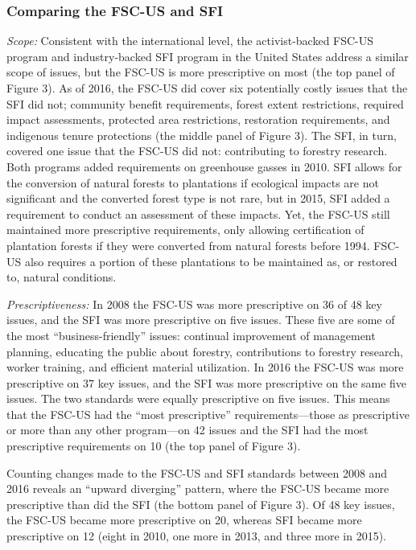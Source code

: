 \documentclass[
      12pt,
            Review ]{article}
\begin{document}
\subsubsection{Comparing the FSC-US and
SFI}\label{comparing-the-fsc-us-and-sfi}

\emph{Scope:} Consistent with the international level, the
activist-backed FSC-US program and industry-backed SFI program in the
United States address a similar scope of issues, but the FSC-US is more
prescriptive on most (the top panel of Figure 3). As of 2016, the FSC-US
did cover six potentially costly issues that the SFI did not; community
benefit requirements, forest extent restrictions, required impact
assessments, protected area restrictions, restoration requirements, and
indigenous tenure protections (the middle panel of Figure 3). The SFI,
in turn, covered one issue that the FSC-US did not: contributing to
forestry research. Both programs added requirements on greenhouse gasses
in 2010. SFI allows for the conversion of natural forests to plantations
if ecological impacts are not significant and the converted forest type
is not rare, but in 2015, SFI added a requirement to conduct an
assessment of these impacts. Yet, the FSC-US still maintained more
prescriptive requirements, only allowing certification of plantation
forests if they were converted from natural forests before 1994. FSC-US
also requires a portion of these plantations to be maintained as, or
restored to, natural conditions.

\emph{Prescriptiveness:} In 2008 the FSC-US was more prescriptive on 36
of 48 key issues, and the SFI was more prescriptive on five issues.
These five are some of the most ``business-friendly'' issues: continual
improvement of management planning, educating the public about forestry,
contributions to forestry research, worker training, and efficient
material utilization. In 2016 the FSC-US was more prescriptive on 37 key
issues, and the SFI was more prescriptive on the same five issues. The
two standards were equally prescriptive on five issues. This means that
the FSC-US had the ``most prescriptive'' requirements---those as
prescriptive or more than any other program---on 42 issues and the SFI
had the most prescriptive requirements on 10 (the top panel of Figure
3).

Counting changes made to the FSC-US and SFI standards between 2008 and
2016 reveals an ``upward diverging'' pattern, where the FSC-US became
more prescriptive than did the SFI (the bottom panel of Figure 3). Of 48
key issues, the FSC-US became more prescriptive on 20, whereas SFI
became more prescriptive on 12 (eight in 2010, one more in 2013, and
three more in 2015).
\end{document}
